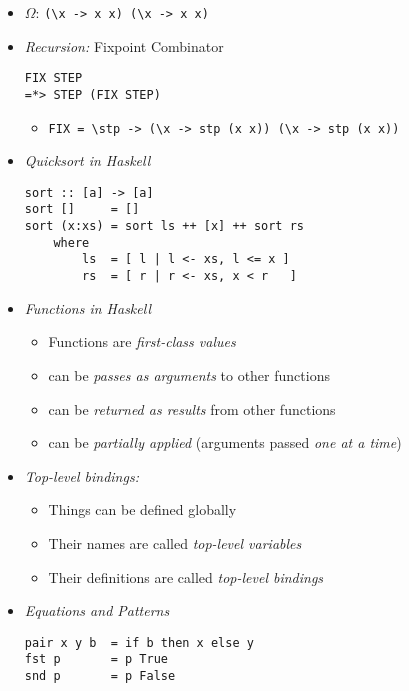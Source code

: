 \documentclass[landscape,8pt]{extarticle}
\newcommand{\code}{\lstinline}
\begin{document}
\begin{multicols}{4}
\begin{itemize}
\begin{itemize}
           \end{itemize}
           \item $\Omega$: \code{(\x -> x x) (\x -> x x)}
           \item \emph{Recursion:} Fixpoint Combinator
           \begin{lstlisting}
FIX STEP
=*> STEP (FIX STEP)
           \end{lstlisting}
           \begin{itemize}
               \item \code{FIX = \stp -> (\x -> stp (x x)) (\x -> stp (x x))}
           \end{itemize}
           \item \emph{Quicksort in Haskell}
           \begin{lstlisting}
sort :: [a] -> [a]
sort []     = []
sort (x:xs) = sort ls ++ [x] ++ sort rs
    where
        ls  = [ l | l <- xs, l <= x ]
        rs  = [ r | r <- xs, x < r   ]
           \end{lstlisting}
           \item \emph{Functions in Haskell}
           \begin{itemize}
               \item Functions are \emph{first-class values}
               \item can be \emph{passes as arguments} to other functions
               \item can be \emph{returned as results} from other functions
               \item can be \emph{partially applied} (arguments passed \emph{one at a time})
           \end{itemize}
           \item \emph{Top-level bindings:}
           \begin{itemize}
               \item Things can be defined globally
               \item Their names are called \emph{top-level variables}
               \item Their definitions are called \emph{top-level bindings}
           \end{itemize}
           \item \emph{Equations and Patterns}
\begin{lstlisting}
pair x y b  = if b then x else y
fst p       = p True
snd p       = p False
\end{lstlisting}
           \begin{itemize}

\end{itemize}
\end{itemize}
\end{multicols}
\end{document}
